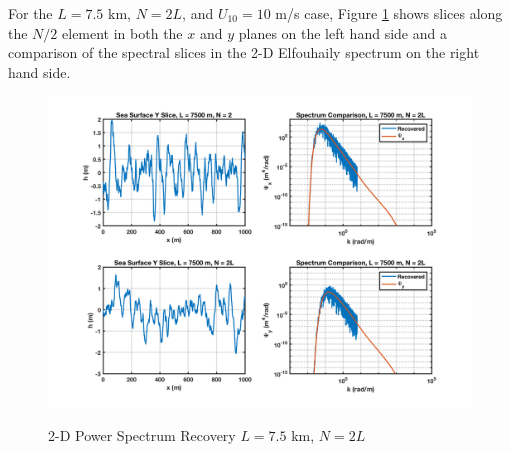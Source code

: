 For the $L = 7.5$ km, $N = 2L$, and $U_{10} = 10$ m/s case, Figure \ref{os_fig:12a} shows slices along the $N/2$ element in both the $x$ and $y$ planes on the left hand side and a comparison of the spectral slices in the 2-D Elfouhaily spectrum on the right hand side.
\begin{figure}[H]
  \begin{center}
\includegraphics[width=6in]{../media/Ocean_Surface/sea_surface_2d_slices_7500.png}
  \end{center}
  \renewcommand{\baselinestretch}{1} \small\normalsize
  \begin{quote}
    \caption[2-D Power Spectrum Recovery $L = 7.5$ km, $N = 2L$]{2-D Power Spectrum Recovery $L = 7.5$ km, $N = 2L$\label{os_fig:12a}}
  \end{quote}
\end{figure}
\renewcommand{\baselinestretch}{2} \small\normalsize
